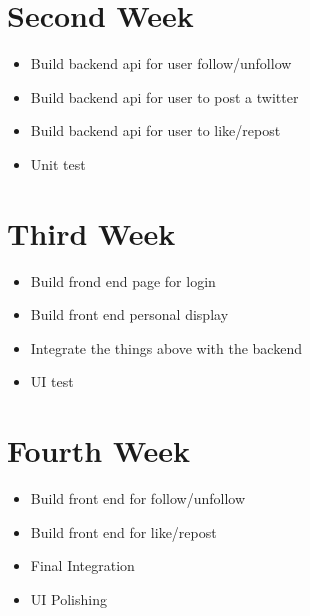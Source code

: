 \documentclass[11pt]{article}
\begin{document}
\section{Second Week}
	\begin{itemize}
		\item Build backend api for user follow/unfollow
		\item Build backend api for user to post a twitter
		\item Build backend api for user to like/repost
		\item Unit test
	\end{itemize}
\section{Third Week}
	\begin{itemize}
		\item Build frond end page for login 
		\item Build front end personal display
		\item Integrate the things above with the backend
		\item UI test
	\end{itemize}
\section{Fourth Week}
	\begin{itemize}
		\item Build front end for follow/unfollow
		\item Build front end for like/repost
		\item Final Integration
		\item UI Polishing
	\end{itemize}
\end{document}
